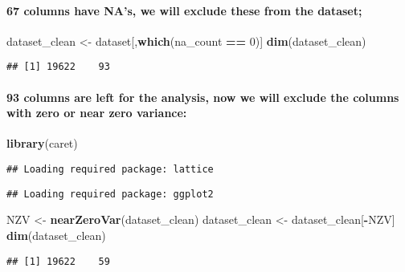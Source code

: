 \documentclass[]{article}
\newenvironment{Shaded}{\begin{snugshade}}{\end{snugshade}}
\newcommand{\KeywordTok}[1]{\textcolor[rgb]{0.13,0.29,0.53}{\textbf{#1}}}
\newcommand{\DecValTok}[1]{\textcolor[rgb]{0.00,0.00,0.81}{#1}}
\newcommand{\StringTok}[1]{\textcolor[rgb]{0.31,0.60,0.02}{#1}}
\newcommand{\OperatorTok}[1]{\textcolor[rgb]{0.81,0.36,0.00}{\textbf{#1}}}
\newcommand{\NormalTok}[1]{#1}
\let\oldparagraph\paragraph
\renewcommand{\paragraph}[1]{\oldparagraph{#1}\mbox{}}
\begin{document}
\paragraph{67 columns have NA's, we will exclude these from the
dataset;}\label{columns-have-nas-we-will-exclude-these-from-the-dataset}

\begin{Shaded}
\begin{Highlighting}[]
\NormalTok{dataset_clean <-}\StringTok{ }\NormalTok{dataset[,}\KeywordTok{which}\NormalTok{(na_count }\OperatorTok{==}\StringTok{ }\DecValTok{0}\NormalTok{)]}
\KeywordTok{dim}\NormalTok{(dataset_clean)}
\end{Highlighting}
\end{Shaded}

\begin{verbatim}
## [1] 19622    93
\end{verbatim}

\paragraph{93 columns are left for the analysis, now we will exclude the
columns with zero or near zero
variance:}\label{columns-are-left-for-the-analysis-now-we-will-exclude-the-columns-with-zero-or-near-zero-variance}

\begin{Shaded}
\begin{Highlighting}[]
\KeywordTok{library}\NormalTok{(caret)}
\end{Highlighting}
\end{Shaded}

\begin{verbatim}
## Loading required package: lattice
\end{verbatim}

\begin{verbatim}
## Loading required package: ggplot2
\end{verbatim}

\begin{Shaded}
\begin{Highlighting}[]
\NormalTok{NZV <-}\StringTok{ }\KeywordTok{nearZeroVar}\NormalTok{(dataset_clean)}
\NormalTok{dataset_clean <-}\StringTok{ }\NormalTok{dataset_clean[}\OperatorTok{-}\NormalTok{NZV]}
\KeywordTok{dim}\NormalTok{(dataset_clean)}
\end{Highlighting}
\end{Shaded}

\begin{verbatim}
## [1] 19622    59
\end{verbatim}
\end{document}
